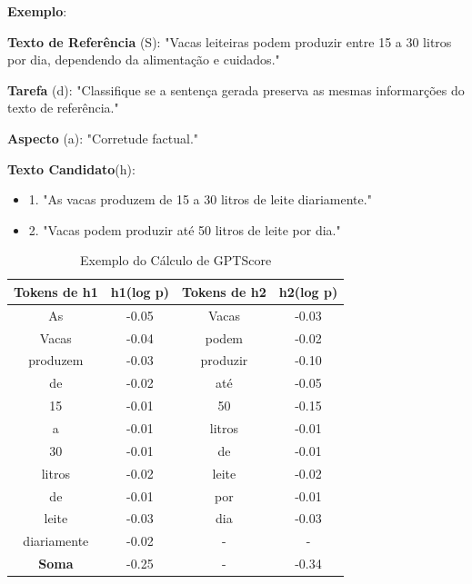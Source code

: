 \textbf{Exemplo}:

\textbf{Texto de Referência} (S): "Vacas leiteiras podem produzir entre 15 a 30 litros por dia, dependendo da alimentação e cuidados."

\textbf{Tarefa} (d): "Classifique se a sentença gerada preserva as mesmas informarções do texto de referência."

\textbf{Aspecto} (a): "Corretude factual."

\textbf{Texto Candidato}(h):
\begin{itemize}
    \item 1. "As vacas produzem de 15 a 30 litros de leite diariamente."
    \item 2. "Vacas podem produzir até 50 litros de leite por dia."
\end{itemize}

\begin{table}[H]
    \centering
    \begin{tabular}{c|c|c|c}
         Tokens de h1     &   h1(log p) &  Tokens de h2    &     h2(log p)    \\
         
         \midrule
         
         As             &   -0.05     &   Vacas       &     -0.03       \\
         Vacas          &   -0.04     &   podem       &     -0.02       \\
         produzem       &   -0.03     &   produzir    &     -0.10       \\
         de             &   -0.02     &   até         &     -0.05       \\
         15             &   -0.01     &   50          &     -0.15       \\
         a              &   -0.01     &   litros      &     -0.01       \\
         30             &   -0.01     &   de          &     -0.01       \\
         litros         &   -0.02     &   leite       &     -0.02       \\
         de             &   -0.01     &   por         &     -0.01       \\ 
         leite          &   -0.03     &   dia         &     -0.03       \\
         diariamente    &   -0.02     &    -          &       -         \\
    
         \bottomrule
         
         \textbf{Soma}  &   -0.25     &       -       &      -0.34     \\
    \end{tabular}
    \caption{Exemplo do Cálculo de GPTScore}
    \label{tab:exemploGPTScore}
\end{table}

